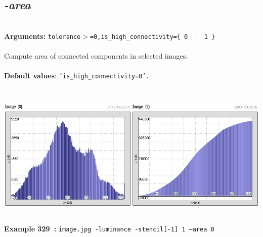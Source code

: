 \documentclass[a4paper,11pt,twoside]{book}
\begin{document}
\subsection{\emph{-area} }\vspace*{-0.5em}
~\\\textbf{Arguments: } 
{\small \texttt{tolerance$>$=0,is\_high\_connectivity=\{ 0 ~$|$~ 1 \}}}\\~\\
Compute area of connected components in selected images.
~\\~\\\textbf{Default values}: {\small \texttt{'is\_high\_connectivity=0'.}}
\begin{center}\includegraphics[keepaspectratio=true,height=7cm,width=\textwidth]{img/gmic_def329.jpg}\\
{\footnotesize \textbf{Example 329~:} \texttt{image.jpg -luminance -stencil[-1] 1 --area 0}}
\end{center}
\end{document}
